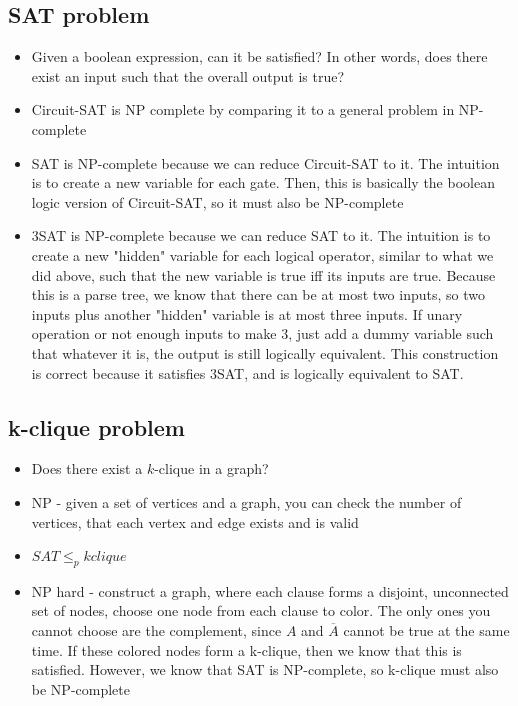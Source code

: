 \subsection{SAT problem}
\begin{itemize}
    \item Given a boolean expression, can it be satisfied? In other words, does there exist an input such that the overall output is true?
    \item Circuit-SAT is NP complete by comparing it to a general problem in NP-complete
    \item SAT is NP-complete because we can reduce Circuit-SAT to it. The intuition is to create a new variable for each gate. Then, this is basically the boolean logic version of Circuit-SAT, so it must also be NP-complete
    \item 3SAT is NP-complete because we can reduce SAT to it. The intuition is to create a new "hidden" variable for each logical operator, similar to what we did above, such that the new variable is true iff its inputs are true. Because this is a parse tree, we know that there can be at most two inputs, so two inputs plus another "hidden" variable is at most three inputs. If unary operation or not enough inputs to make 3, just add a dummy variable such that whatever it is, the output is still logically equivalent. This construction is correct because it satisfies 3SAT, and is logically equivalent to SAT.
\end{itemize}
\subsection{k-clique problem}
\begin{itemize}
    \item Does there exist a $k$-clique in a graph?
    \item NP - given a set of vertices and a graph, you can check the number of vertices, that each vertex and edge exists and is valid
    \item $SAT \leq_{p} kclique$
    \item NP hard - construct a graph, where each clause forms a disjoint, unconnected set of nodes, choose one node from each clause to color. The only ones you cannot choose are the complement, since $A$ and $\overline{A}$ cannot be true at the same time. If these colored nodes form a k-clique, then we know that this is satisfied. However, we know that SAT is NP-complete, so k-clique must also be NP-complete
\end{itemize}

